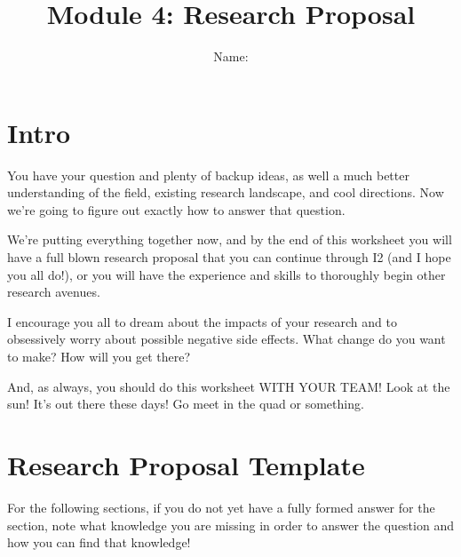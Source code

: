 \documentclass[letterpaper,11pt]{article}
\begin{document}
\title{{\bf Module 4: Research Proposal} }
\author{Name: }

\date{}
\maketitle

\section{Intro}
You have your question and plenty of backup ideas, as well a much better understanding of the field, existing research landscape, and cool directions. Now we're going to figure out exactly how to answer that question. 

We're putting everything together now, and by the end of this worksheet you will have a full blown research proposal that you can continue through I2 (and I hope you all do!), or you will have the experience and skills to thoroughly begin other research avenues. 

I encourage you all to dream about the impacts of your research and to obsessively worry about possible negative side effects. What change do you want to make? How will you get there?

And, as always, you should do this worksheet WITH YOUR TEAM! Look at the sun! It's out there these days! Go meet in the quad or something.

\newline

\section{Research Proposal Template}
For the following sections, if you do not yet have a fully formed answer for the section, note what knowledge you are missing in order to answer the question and how you can find that knowledge!
\end{document}

